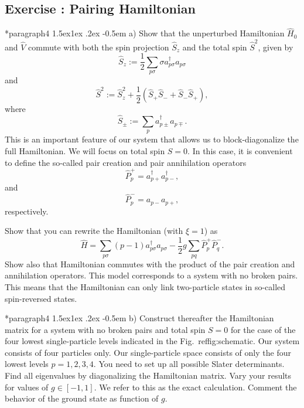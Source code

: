 \documentclass[%
twoside,                 %
final,                   %
10pt]{article}
\makeatletter
\newenvironment{doconceexercise}{}{}
\newcounter{doconceexercisecounter}
\newcommand\subex{\@startsection*{paragraph}{4}{\z@}%
                  {1.5ex\@plus1ex \@minus.2ex}%
                  {-0.5em}%
                  {\normalfont\normalsize\bfseries}}
\makeatother
\begin{document}
\begin{doconceexercise}

\subsection*{Exercise \thedoconceexercisecounter: Pairing Hamiltonian}



\subex{a)}
Show that the unperturbed Hamiltonian $\hat{H}_0$ and $\hat{V}$
  commute with both the spin projection $\hat{S}_z$ and the total spin
  $\hat{S}^2$, given by
\[
  \hat{S}_z := \frac{1}{2}\sum_{p\sigma} \sigma
  a^{\dagger}_{p\sigma}a_{p\sigma}
\]
and
\[
  \hat{S}^2 := \hat{S}_z^2 + \frac{1}{2}(\hat{S}_+\hat{S}_- +
  \hat{S}_-\hat{S}_+),
\]
where
\[
  \hat{S}_\pm := \sum_{p} a^{\dagger}_{p\pm} a_{p\mp}.
\]
This is an important feature of our system that allows us to
block-diagonalize the full Hamiltonian. We will focus on total spin
$S=0$.  In this case, it is convenient to define the so-called pair
creation and pair annihilation operators
\[
\hat{P}^{+}_p = a^{\dagger}_{p+}a^{\dagger}_{p-},
\]
and
\[
\hat{P}^{-}_p = a_{p-}a_{p+},
\] 
respectively.

Show that you can rewrite the Hamiltonian (with $\xi=1$) as
\[
\hat{H}=\sum_{p\sigma}(p-1)a_{p\sigma}^{\dagger}a_{p\sigma}
-\frac{1}{2}g\sum_{pq}\hat{P}^{+}_p\hat{P}^{-}_q.
\]
Show also that Hamiltonian commutes with the product of the pair
creation and annihilation operators.  This model corresponds to a
system with no broken pairs. This means that the Hamiltonian can only
link two-particle states in so-called spin-reversed states.


\subex{b)}
Construct thereafter the Hamiltonian matrix for a system with no
  broken pairs and total spin $S=0$ for the case of the four lowest
  single-particle levels indicated in the
  Fig.~ref{fig:schematic}. Our system consists of four particles
  only.  Our single-particle space consists of only the four lowest
  levels $p=1,2,3,4$.  You need to set up all possible Slater
  determinants.  Find all eigenvalues by diagonalizing the Hamiltonian
  matrix.  Vary your results for values of $g\in [-1,1]$.  We refer to
  this as the exact calculation. Comment the behavior of the ground
  state as function of $g$.



\end{doconceexercise}
\end{document}
